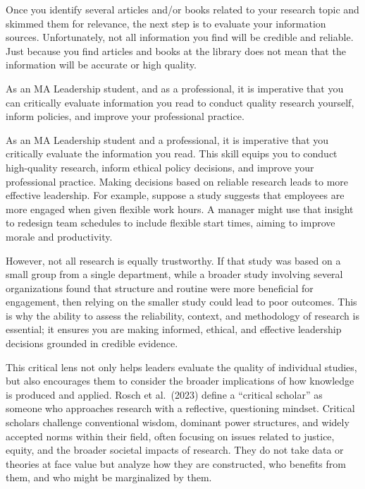 \documentclass[
  letterpaper,
  DIV=11,
  numbers=noendperiod]{scrreprt}
\begin{document}

Once you identify several articles and/or books related to your research
topic and skimmed them for relevance, the next step is to evaluate your
information sources. Unfortunately, not all information you find will be
credible and reliable. Just because you find articles and books at the
library does not mean that the information will be accurate or high
quality.

As an MA Leadership student, and as a professional, it is imperative
that you can critically evaluate information you read to conduct quality
research yourself, inform policies, and improve your professional
practice.

As an MA Leadership student and a professional, it is imperative that
you critically evaluate the information you read. This skill equips you
to conduct high-quality research, inform ethical policy decisions, and
improve your professional practice. Making decisions based on reliable
research leads to more effective leadership. For example, suppose a
study suggests that employees are more engaged when given flexible work
hours. A manager might use that insight to redesign team schedules to
include flexible start times, aiming to improve morale and productivity.

However, not all research is equally trustworthy. If that study was
based on a small group from a single department, while a broader study
involving several organizations found that structure and routine were
more beneficial for engagement, then relying on the smaller study could
lead to poor outcomes. This is why the ability to assess the
reliability, context, and methodology of research is essential; it
ensures you are making informed, ethical, and effective leadership
decisions grounded in credible evidence.

This critical lens not only helps leaders evaluate the quality of
individual studies, but also encourages them to consider the broader
implications of how knowledge is produced and applied. Rosch et
al.~(2023) define a ``critical scholar'' as someone who approaches
research with a reflective, questioning mindset. Critical scholars
challenge conventional wisdom, dominant power structures, and widely
accepted norms within their field, often focusing on issues related to
justice, equity, and the broader societal impacts of research. They do
not take data or theories at face value but analyze how they are
constructed, who benefits from them, and who might be marginalized by
them.
\end{document}
